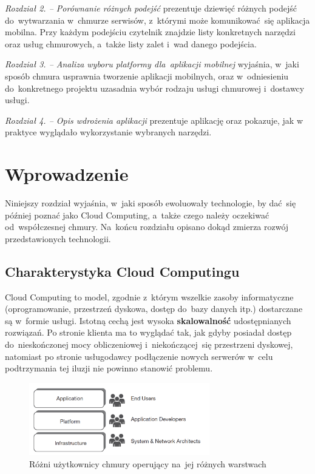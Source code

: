 \documentclass[12pt,a4paper,twoside,titlepage,openright]{book}
\begin{document}
\noindent
\textit{Rozdział 2. -- Porównanie różnych podejść} prezentuje dziewięć różnych podejść do~wytwarzania w~chmurze serwisów, z~którymi może komunikować~się aplikacja mobilna. Przy każdym podejściu czytelnik znajdzie listy konkretnych narzędzi oraz usług chmurowych, a~także listy zalet i~wad danego podejścia.

\noindent
\textit{Rozdział 3. -- Analiza wyboru platformy dla~aplikacji mobilnej} wyjaśnia, w~jaki sposób chmura usprawnia tworzenie aplikacji mobilnych, oraz w~odniesieniu do~konkretnego projektu uzasadnia wybór rodzaju usługi chmurowej i~dostawcy usługi.

\noindent
\textit{Rozdział 4. -- Opis wdrożenia aplikacji} prezentuje aplikację oraz pokazuje, jak w praktyce wyglądało wykorzystanie wybranych narzędzi.


\clearpage{\pagestyle{empty}\cleardoublepage}
\chapter{Wprowadzenie}

Niniejszy rozdział wyjaśnia, w~jaki sposób ewoluowały technologie, by dać~się później poznać jako Cloud Computing, a~także czego należy oczekiwać od~współczesnej chmury. Na~końcu rozdziału opisano dokąd zmierza rozwój przedstawionych technologii.



\section{Charakterystyka Cloud Computingu}

Cloud Computing to model, zgodnie z~którym wszelkie zasoby informatyczne (oprogramowanie, przestrzeń dyskowa, dostęp do~bazy danych itp.) dostarczane są w~formie usługi. Istotną cechą jest wysoka \textbf{skalowalność} udostępnianych rozwiązań. Po stronie klienta ma to wyglądać tak, jak gdyby posiadał dostęp do~nieskończonej mocy obliczeniowej i~niekończącej~się przestrzeni dyskowej, natomiast po stronie usługodawcy podłączenie nowych serwerów w~celu podtrzymania tej iluzji nie powinno stanowić problemu. \cite{ccBiznes}

\begin{figure}[h]
	\centering
			\includegraphics[width=0.7\textwidth]{layers-and-users.png}
		\caption{Różni użytkownicy chmury operujący na~jej różnych warstwach \cite{ccCambridge}}
		\label{fig:layers-and-users}
\end{figure}
\end{document}
